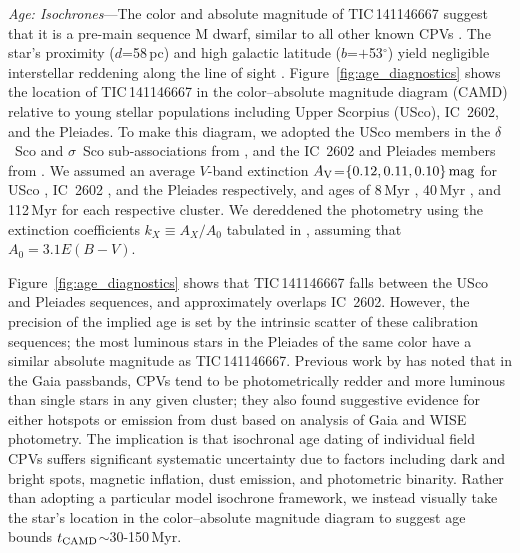\documentclass[11pt,twocolumn,tighten]{aastex7}
\begin{document}
{\it Age: Isochrones}---The color and absolute magnitude of
TIC\,141146667 suggest that it is a pre-main sequence M dwarf, similar
to all other known CPVs \citep{Stauffer2017,Stauffer2021,Bouma2024}.
The star's proximity ($d$=58\,pc) and high galactic latitude
($b$=$+$53$^\circ$) yield negligible interstellar reddening along the
line of sight \citep{Green2019}.  Figure~\ref{fig:age_diagnostics}
shows the location of TIC\,141146667 in the color--absolute magnitude
diagram (CAMD) relative to young stellar populations including Upper
Scorpius (USco), IC~2602, and the Pleiades.  To make this diagram, we
adopted the USco members in the $\delta$~Sco and $\sigma$~Sco
sub-associations from \citet{Ratzenbock2023}, and the IC~2602 and
Pleiades members from \citet{Hunt2024}.  We assumed an average $V$-band
extinction $A_{\rm V}$=$\{0.12, 0.11, 0.10\}\,{\rm mag}$ for USco
\citep{Pecaut2016}, IC~2602 \citep{Hunt2024}, and the Pleiades
\citep{Hunt2024} respectively, and ages of 8\,Myr
\citep{Ratzenbock2023}, 40\,Myr \citep{Randich2018}, and 112\,Myr
\citep{Dahm2015} for each respective cluster.  We dereddened the
photometry using the extinction coefficients $k_X\equiv A_X/A_0$
tabulated in \citep{GaiaCollaboration2018}, assuming that $A_0 = 3.1
E(B-V)$.

Figure~\ref{fig:age_diagnostics} shows that TIC\,141146667 falls
between the USco and Pleiades sequences, and approximately overlaps
IC~2602.  However, the precision of the implied age is set by the
intrinsic scatter of these calibration sequences; the most luminous
stars in the Pleiades of the same color have a similar absolute
magnitude as TIC\,141146667.  Previous work by \citet{Stauffer2021} has
noted that in the Gaia passbands, CPVs tend to be photometrically
redder and more luminous than single stars in any given
cluster; they also found suggestive evidence for either
hotspots or emission from dust based on analysis
of Gaia and WISE photometry.  The implication is that isochronal age
dating of individual field CPVs suffers significant systematic
uncertainty due to factors including dark and bright spots, magnetic
inflation, dust emission, and photometric binarity. Rather than
adopting a particular model isochrone framework, we instead visually
take the star's location in the color--absolute magnitude diagram
to suggest age bounds $t_{\rm CAMD}$$\sim$30-150\,Myr.
\end{document}
